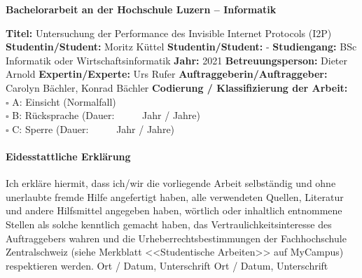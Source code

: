 \vspace*{1.35cm}

\fontsize{12}{14}
\textbf{Bachelorarbeit an der Hochschule Luzern -- Informatik} \\ \vspace*{0.6cm}

\fontsize{10.5}{12}
\noindent
\textbf{Titel:} Untersuchung der Performance des Invisible Internet Protocols (I2P)\newline \newline
\textbf{Studentin/Student:} Moritz Küttel \newline \newline
\textbf{Studentin/Student:} - \newline \newline
\textbf{Studiengang:} BSc Informatik oder Wirtschaftsinformatik \newline \newline
\textbf{Jahr:} 2021\newline \newline
\textbf{Betreuungsperson:} Dieter Arnold \newline \newline
\textbf{Expertin/Experte:} Urs Rufer \newline \newline
\textbf{Auftraggeberin/Auftraggeber:} Carolyn Bächler, Konrad Bächler\newline \newline \newline
\textbf{Codierung / Klassifizierung der Arbeit:}\\
$\square$ A: Einsicht   (Normalfall) \\
$\square$ B: R\"ucksprache      (Dauer:  \ \ \ \ \     Jahr / Jahre)\\
$\square$ C: Sperre     (Dauer:  \ \ \ \ \     Jahr / Jahre)\\




\paragraph{\textbf{Eidesstattliche Erkl\"arung}}
Ich erkl\"are hiermit, dass ich/wir die vorliegende Arbeit selbst\"andig und ohne unerlaubte fremde Hilfe angefertigt haben, alle verwendeten Quellen, Literatur und andere Hilfsmittel angegeben haben, w\"ortlich oder inhaltlich entnommene Stellen als solche kenntlich gemacht haben, das Vertraulichkeitsinteresse des Auftraggebers wahren und die Urheberrechtsbestimmungen der Fachhochschule Zentralschweiz (siehe Merkblatt <<Studentische Arbeiten>> auf MyCampus) respektieren werden. \newline \newline
Ort / Datum, Unterschrift       \underline{\hspace*{4cm}} \newline \newline
Ort / Datum, Unterschrift       \underline{\hspace*{4cm}}


